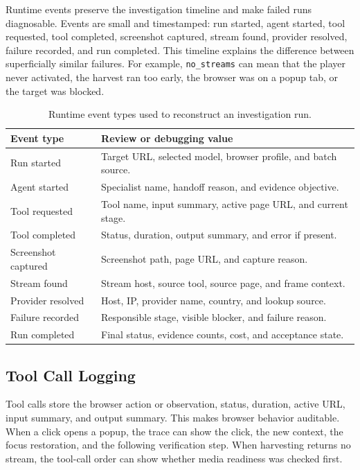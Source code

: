 Runtime events preserve the investigation timeline and make failed runs
diagnosable. Events are small and timestamped: run started, agent started,
tool requested, tool completed, screenshot captured, stream found, provider
resolved, failure recorded, and run completed. This timeline explains the
difference between superficially similar failures. For example,
\texttt{no\_streams} can mean that the player never activated, the harvest ran
too early, the browser was on a popup tab, or the target was blocked.

\begin{table}[!htbp]
\centering
\begin{tabularx}{\textwidth}{Q{3.6cm}Y}
\toprule
{}
Event type & Review or debugging value \\
\midrule
Run started & Target URL, selected model, browser profile, and batch source. \\
Agent started & Specialist name, handoff reason, and evidence objective. \\
Tool requested & Tool name, input summary, active page URL, and current stage. \\
Tool completed & Status, duration, output summary, and error if present. \\
Screenshot captured & Screenshot path, page URL, and capture reason. \\
Stream found & Stream host, source tool, source page, and frame context. \\
Provider resolved & Host, IP, provider name, country, and lookup source. \\
Failure recorded & Responsible stage, visible blocker, and failure reason. \\
Run completed & Final status, evidence counts, cost, and acceptance state. \\
\bottomrule
\end{tabularx}
\caption{Runtime event types used to reconstruct an investigation run.}
\label{tab:runtime-event-types-main}
\end{table}

\subsection{Tool Call Logging}

Tool calls store the browser action or observation, status, duration, active
URL, input summary, and output summary. This makes browser behavior auditable.
When a click opens a popup, the trace can show the click, the new context, the
focus restoration, and the following verification step. When harvesting
returns no stream, the tool-call order can show whether media readiness was
checked first.

